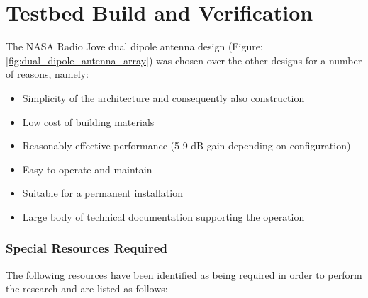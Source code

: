 \documentclass[runningheads,a4paper]{llncs}
\begin{document}
%
%
\newpage
\chapter*{Testbed Build and Verification}
The NASA Radio Jove dual dipole antenna design (Figure: \ref{fig:dual_dipole_antenna_array}) was chosen over the other designs for a number of reasons, namely:

\begin{itemize}
	\item Simplicity of the architecture and consequently also construction
	\item Low cost of building materials
	\item Reasonably effective performance (5-9 dB gain depending on configuration)
	\item Easy to operate and maintain
	\item Suitable for a permanent installation
	\item Large body of technical documentation supporting the operation
\end{itemize}


\subsection*{Special Resources Required}

The following resources have been identified as being required in order to perform the research and are listed as follows:
\end{document}
